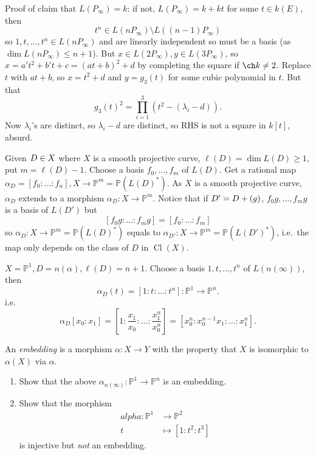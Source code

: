\documentclass[a4paper]{article}
\DeclareMathOperator{\Cl}{Cl}
\renewcommand*{\P}{\mathbb{P}}
\let\div\relax
\begin{document}
\begin{eg}
  Proof of claim that \(L(P_\infty) = k\): if not, \(L(P_\infty) = k + kt\) for some \(t \in k(E)\), then
  \[
    t^n \in L(nP_\infty) \setminus L((n - 1)P_\infty)
  \]
  so \(1, t, \dots, t^n \in L(nP_\infty)\) and are linearly independent so must be a basis (as \(\dim L(nP_\infty) \leq n + 1\)). But \(x \in L(2P_\infty), y \in L(3P_\infty)\), so \(x = a't^2 + b't + c = (at + b)^2 + d\) by completing the square if \(\ch k \neq 2\). Replace \(t\) with \(at + b\), so \(x = t^2 + d\) and \(y = g_3(t)\) for some cubic polynomial in \(t\). But that
  \[
    g_3(t)^2 = \prod_{i = 1}^3 (t^2 - (\lambda_i - d)).
  \]
  Now \(\lambda_i\)'s are distinct, so \(\lambda_i - d\) are distinct, so RHS is not a square in \(k[t]\), absurd.
\end{eg}

Given \(D \in \div X\) where \(X\) is a smooth projective curve, \(\ell(D) = \dim L(D) \geq 1\), put \(m = \ell (D) - 1\). Choose a basis \(f_0, \dots, f_m\) of \(L(D)\). Get a rational map \(\alpha_D = [f_0: \dots: f_n], X \to \P^m = \P(L(D)^*)\). As \(X\) is a smooth projective curve, \(\alpha_D\) extends to a morphism \(\alpha_D: X \to \P^m\). Notice that if \(D' = D + \div(g)\), \(f_0g, \dots, f_mg\) is a basis of \(L(D')\) but
\[
  [f_0g: \dots: f_mg] = [f_0: \dots: f_m]
\]
so \(\alpha_D: X \to \P^m = \P(L(D)^*)\) equals to \(\alpha_{D'}: X \to \P^m = \P(L(D')^*)\), i.e.\ the map only depends on the class of \(D\) in \(\Cl(X)\).

\begin{eg}
  \(X = \P^1, D = n(\alpha), \ell(D) = n + 1\). Choose a basis \(1, t, \dots, t^n\) of \(L(n(\infty))\), then
  \[
    \alpha_D(t) = [1:t: \dots: t^n]: \P^1 \to \P^n.
  \]
  i.e.
  \[
    \alpha_D[x_0: x_1] = [1: \frac{x_1}{x_0}: \dots: \frac{x_1^n}{x_0^n}] = [x_0^n: x_0^{n - 1}x_1: \dots: x_1^n].
  \]
\end{eg}

\begin{definition}[Embedding]
  An \emph{embedding} is a morphism \(\alpha: X \to Y\) with the property that \(X\) is isomorphic to \(\alpha(X)\) via \(\alpha\).
\end{definition}

\begin{ex}\leavevmode
  \begin{enumerate}
  \item Show that the above \(\alpha_{n(\infty)}: \P^1 \to \P^n\) is an embedding.
  \item Show that the morphism
    \begin{align*}
      alpha: \P^1 &\to \P^2 \\
      t &\mapsto [1: t^2: t^3]
    \end{align*}
    is injective but \emph{not} an embedding.
  \end{enumerate}
\end{ex}
\end{document}
